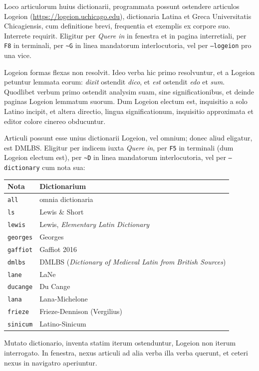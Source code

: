 \documentclass[12pt,
              article,
              oneside
              ]{memoir}
\newcommand*{\menu}[1]{\textit{#1}}
\newcommand*{\key}[1]{\texttt{#1}}
\newcommand*{\tl}{\textasciitilde}
\begin{document}
%
Loco articulorum huius dictionarii, programmata possunt ostendere
articulos Logeion (\url{https://logeion.uchicago.edu}), dictionaria
Latina et Greca Universitatis Chicagiensis, cum definitione brevi,
frequentia et exemplis ex corpore suo. Interrete requirit. Eligitur per
\menu{Quere in} in fenestra et in pagina interretiali, per \key{F8} in
terminali, per \texttt{\tl G} in linea mandatorum interlocutoria, vel per
\texttt{--logeion} pro una vice.

%
Logeion formas flexas non resolvit. Ideo verba hic primo resolvuntur, et a
Logeion petuntur lemmata eorum: \textit{dixit} ostendit \textit{dico}, et
\textit{est} ostendit \textit{edo} et \textit{sum}. Quodlibet verbum
primo ostendit analysim suam, sine significationibus, et deinde paginas
Logeion lemmatum suorum. Dum Logeion electum est, inquisitio a solo
Latino incipit, et altera directio, lingua significationum, inquisitio
approximata et editor colore cinereo obducuntur.

%
Articuli possunt esse unius dictionarii Logeion, vel omnium; donec aliud
eligatur, est DMLBS. Eligitur per indicem iuxta \menu{Quere in}, per
\key{F5} in terminali (dum Logeion electum est), per \texttt{\tl D} in
linea mandatorum interlocutoria, vel per \texttt{--dictionary} cum nota
sua:

\begin{longtable}{@{}lp{}@{}}
\toprule
Nota & Dictionarium\\
\midrule
\endhead
\texttt{all} & omnia dictionaria\\
\texttt{ls} & Lewis \& Short\\
\texttt{lewis} & Lewis, \textit{Elementary Latin Dictionary}\\
\texttt{georges} & Georges\\
\texttt{gaffiot} & Gaffiot 2016\\
\texttt{dmlbs} & DMLBS (\textit{Dictionary of Medieval Latin from British Sources})\\
\texttt{lane} & LaNe\\
\texttt{ducange} & Du Cange\\
\texttt{lana} & Lana-Michelone\\
\texttt{frieze} & Frieze-Dennison (Vergilius)\\
\texttt{sinicum} & Latino-Sinicum\\
\bottomrule
\end{longtable}

\noindent
Mutato dictionario, inventa statim iterum ostenduntur, Logeion non
iterum interrogato. In fenestra, nexus articuli ad alia verba illa verba
querunt, et ceteri nexus in navigatro aperiuntur.
\end{document}
